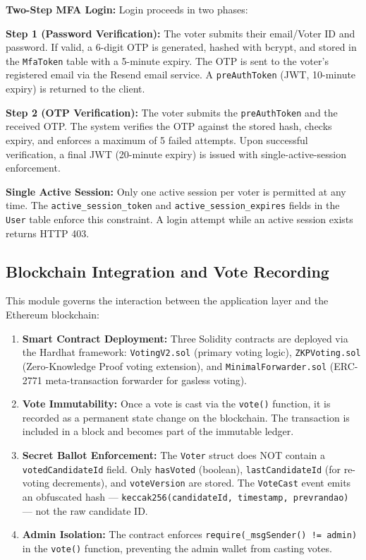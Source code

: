 \documentclass[oneside,a4paper,12pt]{book}
\begin{document}
\textbf{Two-Step MFA Login:} Login proceeds in two phases:

\textbf{Step 1 (Password Verification):} The voter submits their email/Voter ID and password. If valid, a 6-digit OTP is generated, hashed with bcrypt, and stored in the \texttt{MfaToken} table with a 5-minute expiry. The OTP is sent to the voter's registered email via the Resend email service. A \texttt{preAuthToken} (JWT, 10-minute expiry) is returned to the client.

\textbf{Step 2 (OTP Verification):} The voter submits the \texttt{preAuthToken} and the received OTP. The system verifies the OTP against the stored hash, checks expiry, and enforces a maximum of 5 failed attempts. Upon successful verification, a final JWT (20-minute expiry) is issued with single-active-session enforcement.

\textbf{Single Active Session:} Only one active session per voter is permitted at any time. The \texttt{active\_session\_token} and \texttt{active\_session\_expires} fields in the \texttt{User} table enforce this constraint. A login attempt while an active session exists returns HTTP 403.

\subsection{Blockchain Integration and Vote Recording}
This module governs the interaction between the application layer and the Ethereum blockchain:
\begin{enumerate}[label=\roman*., leftmargin=1.5cm]
    \item \textbf{Smart Contract Deployment:} Three Solidity contracts are deployed via the Hardhat framework: \texttt{VotingV2.sol} (primary voting logic), \texttt{ZKPVoting.sol} (Zero-Knowledge Proof voting extension), and \texttt{MinimalForwarder.sol} (ERC-2771 meta-transaction forwarder for gasless voting).

    \item \textbf{Vote Immutability:} Once a vote is cast via the \texttt{vote()} function, it is recorded as a permanent state change on the blockchain. The transaction is included in a block and becomes part of the immutable ledger.

    \item \textbf{Secret Ballot Enforcement:} The \texttt{Voter} struct does NOT contain a \texttt{votedCandidateId} field. Only \texttt{hasVoted} (boolean), \texttt{lastCandidateId} (for re-voting decrements), and \texttt{voteVersion} are stored. The \texttt{VoteCast} event emits an obfuscated hash --- \texttt{keccak256(candidateId, timestamp, prevrandao)} --- not the raw candidate ID.

    \item \textbf{Admin Isolation:} The contract enforces \texttt{require(\_msgSender() != admin)} in the \texttt{vote()} function, preventing the admin wallet from casting votes.
\end{enumerate}
\end{document}
